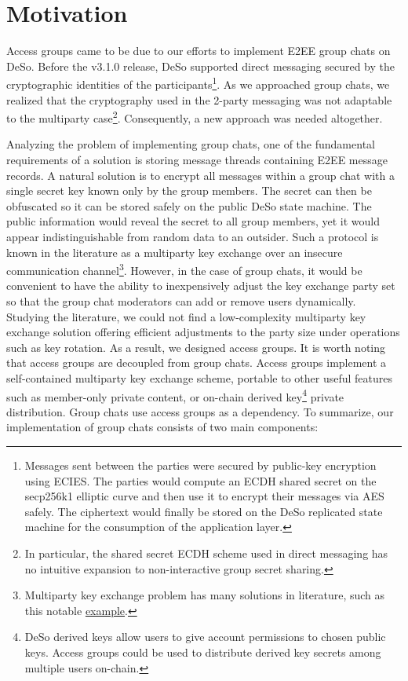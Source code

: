 \documentclass[oneside, 12pt]{article}
\newcommand{\fn}[1]{\footnote{\hangpara{1.4em}{1} #1}}
\begin{document}
\newpage
\tableofcontents
\newpage

\section{Motivation}
Access groups came to be due to our efforts to implement E2EE group chats on DeSo. Before the v3.1.0 release, DeSo supported direct messaging secured by the cryptographic identities of the participants\fn{Messages sent between the parties were secured by public-key encryption using ECIES. The parties would compute an ECDH shared secret on the secp256k1 elliptic curve and then use it to encrypt their messages via AES safely. The ciphertext would finally be stored on the DeSo replicated state machine for the consumption of the application layer.}. As we approached group chats, we realized that the cryptography used in the 2-party messaging was not adaptable to the multiparty case\fn{In particular, the shared secret ECDH scheme used in direct messaging has no intuitive expansion to non-interactive group secret sharing.}. Consequently, a new approach was needed altogether.

Analyzing the problem of implementing group chats, one of the fundamental requirements of a solution is storing message threads containing E2EE message records. A natural solution is to encrypt all messages within a group chat with a single secret key known only by the group members. The secret can then be obfuscated so it can be stored safely on the public DeSo state machine. The public information would reveal the secret to all group members, yet it would appear indistinguishable from random data to an outsider. Such a protocol is known in the literature as a multiparty key exchange over an insecure communication channel\fn{Multiparty key exchange problem has many solutions in literature, such as this notable \href{https://eprint.iacr.org/2013/642.pdf}{example}.}. However, in the case of group chats, it would be convenient to have the ability to inexpensively adjust the key exchange party set so that the group chat moderators can add or remove users dynamically. Studying the literature, we could not find a low-complexity multiparty key exchange solution offering efficient adjustments to the party size under operations such as key rotation. As a result, we designed access groups. It is worth noting that access groups are decoupled from group chats. Access groups implement a self-contained multiparty key exchange scheme,  portable to other useful features such as member-only private content, or on-chain derived key\fn{DeSo derived keys allow users to give account permissions to chosen public keys. Access groups could be used to distribute derived key secrets among multiple users on-chain.} private distribution. Group chats use access groups as a dependency. To summarize, our implementation of group chats consists of two main components:
\end{document}
